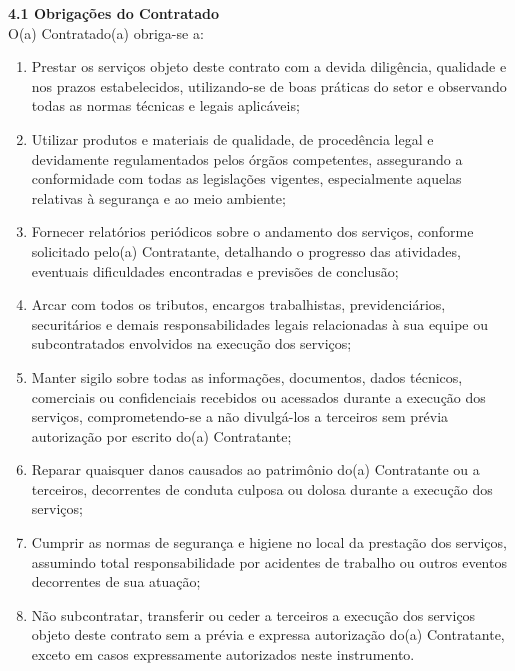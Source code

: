 \documentclass[a4paper,12pt]{article}
\begin{document}
\textbf{4.1 Obrigações do Contratado}\\ 
O(a) Contratado(a) obriga-se a:
\begin{enumerate}[label=\alph*)]
    \item Prestar os serviços objeto deste contrato com a devida diligência, qualidade e nos prazos estabelecidos, utilizando-se de boas práticas do setor e observando todas as normas técnicas e legais aplicáveis;
    \item Utilizar produtos e materiais de qualidade, de procedência legal e devidamente regulamentados pelos órgãos competentes, assegurando a conformidade com todas as legislações vigentes, especialmente aquelas relativas à segurança e ao meio ambiente;
    \item Fornecer relatórios periódicos sobre o andamento dos serviços, conforme solicitado pelo(a) Contratante, detalhando o progresso das atividades, eventuais dificuldades encontradas e previsões de conclusão;
    \item Arcar com todos os tributos, encargos trabalhistas, previdenciários, securitários e demais responsabilidades legais relacionadas à sua equipe ou subcontratados envolvidos na execução dos serviços;
    \item Manter sigilo sobre todas as informações, documentos, dados técnicos, comerciais ou confidenciais recebidos ou acessados durante a execução dos serviços, comprometendo-se a não divulgá-los a terceiros sem prévia autorização por escrito do(a) Contratante;
    \item Reparar quaisquer danos causados ao patrimônio do(a) Contratante ou a terceiros, decorrentes de conduta culposa ou dolosa durante a execução dos serviços;
    \item Cumprir as normas de segurança e higiene no local da prestação dos serviços, assumindo total responsabilidade por acidentes de trabalho ou outros eventos decorrentes de sua atuação;
    \item Não subcontratar, transferir ou ceder a terceiros a execução dos serviços objeto deste contrato sem a prévia e expressa autorização do(a) Contratante, exceto em casos expressamente autorizados neste instrumento.
\end{enumerate}
\end{document}
